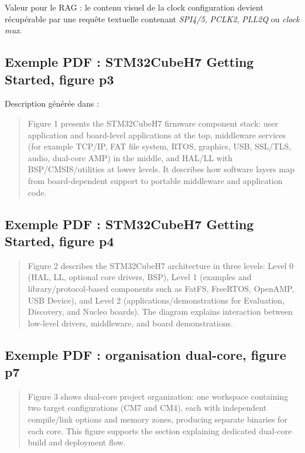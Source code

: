 \documentclass[11pt,a4paper]{article}
\begin{document}
Valeur pour le RAG : le contenu visuel de la clock configuration devient récupérable par une requête textuelle contenant \textit{SPI4/5}, \textit{PCLK2}, \textit{PLL2Q} ou \textit{clock mux}.

\subsection{Exemple PDF : STM32CubeH7 Getting Started, figure p3}

Description générée dans  :

\begin{quote}\small
Figure 1 presents the STM32CubeH7 firmware component stack: user application and board-level applications at the top, middleware services (for example TCP/IP, FAT file system, RTOS, graphics, USB, SSL/TLS, audio, dual-core AMP) in the middle, and HAL/LL with BSP/CMSIS/utilities at lower levels. It describes how software layers map from board-dependent support to portable middleware and application code.
\end{quote}

\subsection{Exemple PDF : STM32CubeH7 Getting Started, figure p4}

\begin{quote}\small
Figure 2 describes the STM32CubeH7 architecture in three levels: Level 0 (HAL, LL, optional core drivers, BSP), Level 1 (examples and library/protocol-based components such as FatFS, FreeRTOS, OpenAMP, USB Device), and Level 2 (applications/demonstrations for Evaluation, Discovery, and Nucleo boards). The diagram explains interaction between low-level drivers, middleware, and board demonstrations.
\end{quote}

\subsection{Exemple PDF : organisation dual-core, figure p7}

\begin{quote}\small
Figure 3 shows dual-core project organization: one workspace containing two target configurations (CM7 and CM4), each with independent compile/link options and memory zones, producing separate binaries for each core. This figure supports the section explaining dedicated dual-core build and deployment flow.
\end{quote}
\end{document}
